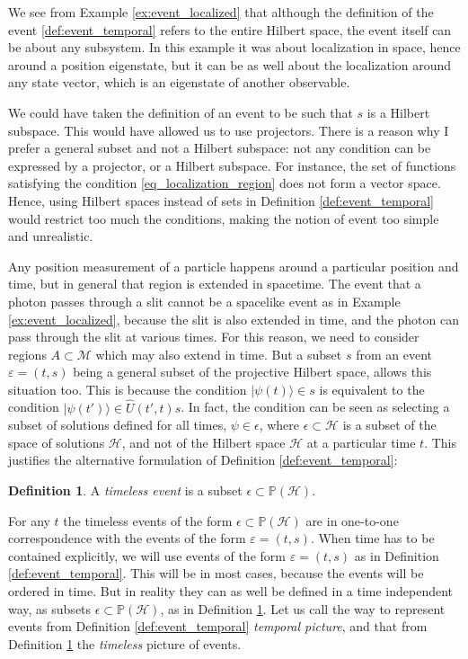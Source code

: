 \documentclass[11pt]{amsart}
\theoremstyle{definition}
\newtheorem{definition}{Definition}[section]
\theoremstyle{plain}
\begin{document}
We see from Example \ref{ex:event_localized} that although the definition of the event \ref{def:event_temporal} refers to the entire Hilbert space, the event itself can be about any subsystem. In this example it was about localization in space, hence around a position eigenstate, but it can be as well about the localization around any state vector, which is an eigenstate of another observable.

We could have taken the definition of an event to be such that $s$ is a Hilbert subspace. This would have allowed us to use projectors. There is a reason why I prefer a general subset and not a Hilbert subspace: not any condition can be expressed by a projector, or a Hilbert subspace. For instance, the set of functions satisfying the condition \eqref{eq_localization_region} does not form a vector space. Hence, using Hilbert spaces instead of sets in Definition \ref{def:event_temporal} would restrict too much the conditions, making the notion of event too simple and unrealistic.

Any position measurement of a particle happens around a particular position and time, but in general that region is extended in spacetime. 
The event that a photon passes through a slit cannot be a spacelike event as in Example \ref{ex:event_localized}, because the slit is also extended in time, and the photon can pass through the slit at various times. For this reason, we need to consider regions $A\subset\mathcal M$ which may also extend in time. But a subset $s$ from an event $\varepsilon=(t,s)$ being a general subset of the projective Hilbert space, allows this situation too. This is because the condition $|{\psi(t)}\rangle\in s$ is equivalent to the condition $|{\psi(t')}\rangle\in \hat U(t',t)s$. In fact, the condition can be seen as selecting a subset of solutions defined for all times, $\psi\in\epsilon$, where $\epsilon\subset\mathscr{H}$ is a subset of the space of solutions $\mathscr{H}$, and not of the Hilbert space $\mathcal{H}$ at a particular time $t$.
This justifies the alternative formulation of Definition \ref{def:event_temporal}:

\begin{definition}
\label{def:event_timeless}
A \emph{timeless event} is a subset $\epsilon\subset\mathbb P(\mathscr{H})$. 
\end{definition}

For any $t$ the timeless events of the form $\epsilon\subset\mathbb P(\mathscr{H})$ are in one-to-one correspondence with the events of the form $\varepsilon=(t,s)$. When time has to be contained explicitly, we will use events of the form $\varepsilon=(t,s)$ as in Definition \ref{def:event_temporal}. This will be in most cases, because the events will be ordered in time. But in reality they can as well be defined in a time independent way, as subsets $\epsilon\subset\mathbb P(\mathscr{H})$, as in Definition \ref{def:event_timeless}.
Let us call the way to represent events from Definition \ref{def:event_temporal} \emph{temporal picture}, and that from Definition \ref{def:event_timeless} the \emph{timeless} picture of events.
\end{document}
